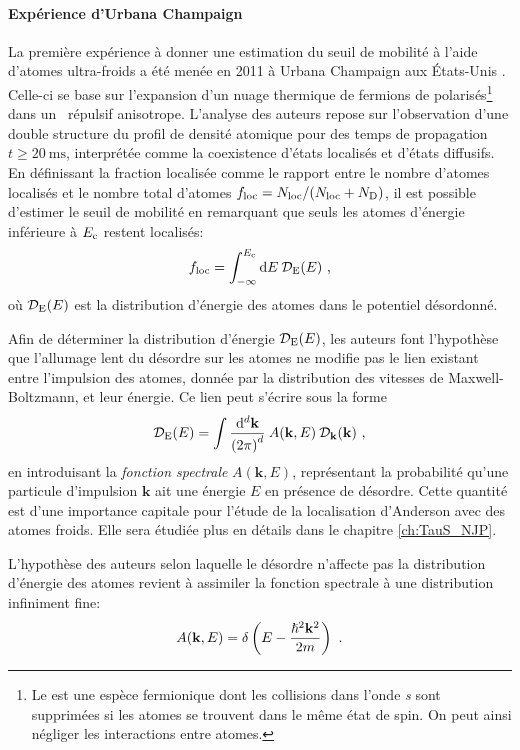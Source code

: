 \paragraph*{Expérience d'Urbana Champaign}
La première expérience à donner une estimation du seuil de mobilité à l'aide d'atomes ultra-froids a été menée en 2011 à Urbana Champaign aux États-Unis \citep{kondov2011three}. Celle-ci se base sur l'expansion d'un nuage thermique de fermions de  polarisés\footnote{Le  est une espèce fermionique dont les collisions dans l'onde \textit{s} sont supprimées si les atomes se trouvent dans le même état de spin. On peut ainsi négliger les interactions entre atomes.} dans un \speckle\ répulsif anisotrope. L'analyse des auteurs repose sur l'observation d'une double structure du profil de densité atomique pour des temps de propagation $t\geq \SI{20}{\milli\second}$, interprétée comme la coexistence d'états localisés et d'états diffusifs. En définissant la fraction localisée comme le rapport entre le nombre d'atomes localisés et le nombre total d'atomes $f_{\mathrm{loc}}=N_{\mathrm{loc}}/(N_{\mathrm{loc}}+N_{\mathrm{D}})$, il est possible d'estimer le seuil de mobilité en remarquant que seuls les atomes d'énergie inférieure à $E_{\mathrm{c}}$ restent localisés:
\begin{equation}
f_{\mathrm{loc}}=\int_{-\infty}^{E_{\mathrm{c}}}{\mathop{}\mathopen{}\mathrm{d} E \: \mathcal{D}_{\mathrm{E}}(E)} \text{ ,}
\label{eq:fraction_localisee}
\end{equation}
où $\mathcal{D}_{\mathrm{E}}(E)$ est la distribution d'énergie des atomes dans le potentiel désordonné.

Afin de déterminer la distribution d'énergie $\mathcal{D}_{\mathrm{E}}(E)$, les auteurs font l'hypothèse que l'allumage lent du désordre sur les atomes ne modifie pas le lien existant entre l'impulsion des atomes, donnée par la distribution des vitesses de Maxwell-Boltzmann, et leur énergie. Ce lien peut s'écrire sous la forme
\begin{equation}
\mathcal{D}_{\mathrm{E}}(E)= \int{\frac{\mathrm{d}^d \mathbf{k}}{{(2 \pi)}^d} \: A(\mathbf{k},E) \: \mathcal{D}_{\mathbf{k}}(\mathbf{k})} \text{ ,}
\label{eq:fonction_spectrale}
\end{equation}
en introduisant la \emph{fonction spectrale} $A(\mathbf{k},E)$, représentant la probabilité qu'une particule d'impulsion $\mathbf{k}$ ait une énergie $E$ en présence de désordre. Cette quantité est d'une importance capitale pour l'étude de la localisation d'Anderson avec des atomes froids. Elle sera étudiée plus en détails dans le chapitre \ref{ch:TauS_NJP}.

L'hypothèse des auteurs selon laquelle le désordre n'affecte pas la distribution d'énergie des atomes revient à assimiler la fonction spectrale à une distribution infiniment fine:
\begin{equation}
A(\mathbf{k},E) = \delta\left(E- \frac{\hslash^2 \mathbf{k}^2}{2m}\right) \text{ .}
\label{eq:hypothese_urbana_champaign}
\end{equation}

